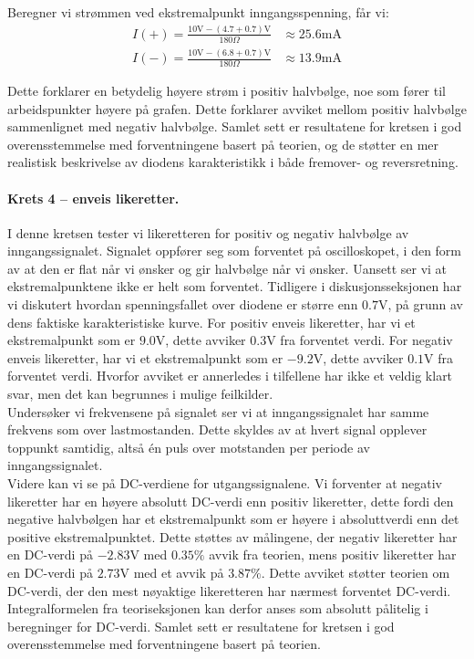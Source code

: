 \noindent
Beregner vi strømmen ved ekstremalpunkt inngangsspenning, får vi:
\[
\begin{aligned}
    I\left(+\right) = \frac{10\text{V} - \left(4.7 + 0.7\right)\text{V}}{180 \Omega} &\approx 25.6\text{mA} \\
    I\left(-\right) = \frac{10\text{V} - \left(6.8 + 0.7\right)\text{V}}{180 \Omega} &\approx 13.9\text{mA}
\end{aligned}
\]

\noindent
Dette forklarer en betydelig høyere strøm i positiv halvbølge, noe som fører til arbeidspunkter høyere på grafen. Dette forklarer avviket mellom positiv halvbølge sammenlignet med negativ halvbølge. Samlet sett er resultatene for kretsen i god overensstemmelse med forventningene basert på teorien, og de støtter en mer realistisk beskrivelse av diodens karakteristikk i både fremover- og reversretning.

\paragraph{Krets 4 -- enveis likeretter. } I denne kretsen tester vi likeretteren for positiv og negativ halvbølge av inngangssignalet. Signalet oppfører seg som forventet på oscilloskopet, i den form av at den er flat når vi ønsker og gir halvbølge når vi ønsker. Uansett ser vi at ekstremalpunktene ikke er helt som forventet. Tidligere i diskusjonsseksjonen har vi diskutert hvordan spenningsfallet over diodene er større enn $0.7\text{V}$, på grunn av dens faktiske karakteristiske kurve. For positiv enveis likeretter, har vi et ekstremalpunkt som er $9.0\text{V}$, dette avviker $0.3\text{V}$ fra forventet verdi. For negativ enveis likeretter, har vi et ekstremalpunkt som er $-9.2\text{V}$, dette avviker $0.1\text{V}$ fra forventet verdi. Hvorfor avviket er annerledes i tilfellene har ikke et veldig klart svar, men det kan begrunnes i mulige feilkilder.
\\[1em]
Undersøker vi frekvensene på signalet ser vi at inngangssignalet har samme frekvens som over lastmostanden. Dette skyldes av at hvert signal opplever toppunkt samtidig, altså én puls over motstanden per periode av inngangssignalet.
\\[1em]
Videre kan vi se på DC-verdiene for utgangssignalene. Vi forventer at negativ likeretter har en høyere absolutt DC-verdi enn positiv likeretter, dette fordi den negative halvbølgen har et ekstremalpunkt som er høyere i absoluttverdi enn det positive ekstremalpunktet. Dette støttes av målingene, der negativ likeretter har en DC-verdi på $-2.83\text{V}$ med $0.35\%$ avvik fra teorien, mens positiv likeretter har en DC-verdi på $2.73\text{V}$ med et avvik på $3.87\%$. Dette avviket støtter teorien om DC-verdi, der den mest nøyaktige likeretteren har nærmest forventet DC-verdi. Integralformelen fra teoriseksjonen kan derfor anses som absolutt pålitelig i beregninger for DC-verdi. Samlet sett er resultatene for kretsen i god overensstemmelse med forventningene basert på teorien.

